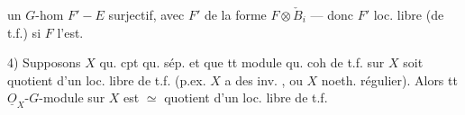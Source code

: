 
un $G$-hom  $F'-E$ surjectif, avec $F'$ de la forme $F\otimes\check B_i$ --- donc $F'$ loc. libre (de t.f.) si $F$ l'est.

4) Supposons $X$ qu. cpt qu. sép. et que tt module qu. coh de t.f. sur $X$ soit quotient d'un loc. libre de t.f. (p.ex. $X$ a des  inv. , ou $X$ noeth. régulier). Alors tt $\underline O_X$-$G$-module sur $X$ est $\simeq$ quotient d'un loc. libre de t.f.

